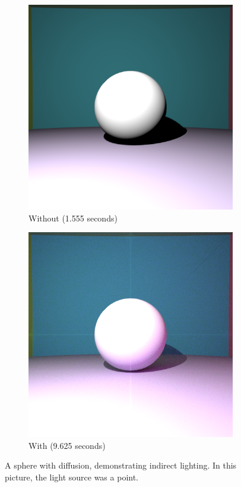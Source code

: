 \documentclass{amsart}
\begin{document}
\begin{figure}
     \centering
     \begin{subfigure}[b]{0.49\textwidth}
         \centering
         \includegraphics[width=\textwidth]{img/fig2_1.png}
         \caption{Without (1.555 seconds)}
     \end{subfigure}
     \hfill
     \begin{subfigure}[b]{0.49\textwidth}
         \centering
         \includegraphics[width=\textwidth]{img/fig2_2.png}
         \caption{With (9.625 seconds)}
     \end{subfigure}
     \caption{A sphere with diffusion, demonstrating indirect lighting. In this picture, the light source was a point.}
\end{figure}
\end{document}
